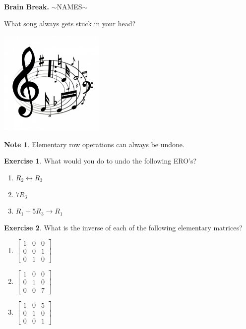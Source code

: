 \documentclass[handout]{beamer}
\newcommand{\fn}{\insertframenumber}
\theoremstyle{definition}
\newtheorem{exercise}{Exercise}
\newtheorem*{nb}{Note}
\begin{document}
\begin{frame}{\fn}
	\begin{block}{\textbf{Brain Break.}}
		$\sim$NAMES$\sim$
		
		What song always gets stuck in your head?
		
		\begin{center}
			\includegraphics[width=2in]{images/song}
		\end{center}
	\end{block}
\end{frame}
\begin{frame}{\fn}
	\begin{nb}
		Elementary row operations can always be undone.
	\end{nb}
	\begin{exercise}
		What would you do to undo the following ERO's?
		\begin{multicols}{3}\begin{enumerate}[label=(\alph*)]
			\item $R_2\leftrightarrow R_3$
			\item $7R_3$
			\item $R_1+5R_3\rightarrow R_1$
		\end{enumerate}
		\end{multicols}
	\end{exercise}
\begin{exercise}
	What is the inverse of each of the following elementary matrices?
	\begin{multicols}{3}
		\begin{enumerate}[label=(\alph*)]
		\item $\begin{bmatrix}1&0&0\\0&0&1\\0&1&0\end{bmatrix}$
		\item $\begin{bmatrix}1&0&0\\0&1&0\\0&0&7\end{bmatrix}$
		\item $\begin{bmatrix}1&0&5\\0&1&0\\0&0&1\end{bmatrix}$
	\end{enumerate}
\end{multicols}
	\end{exercise}
\end{frame}
\end{document}
